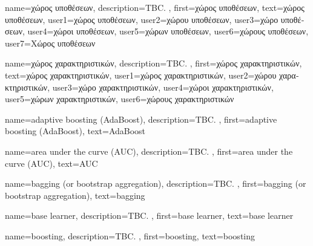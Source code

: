 {name={\foreignlanguage{greek}{χώρος υποθέσεων}}, 
	description={TBC. },
	first={\foreignlanguage{greek}{χώρος υποθέσεων}},
	text={\foreignlanguage{greek}{χώρος υποθέσεων}}, 
	user1={\foreignlanguage{greek}{χώρος υποθέσεων}}, %
	user2={\foreignlanguage{greek}{χώρου υποθέσεων}}, %
	user3={\foreignlanguage{greek}{χώρο υποθέσεων}}, %
	user4={\foreignlanguage{greek}{χώροι υποθέσεων}}, %
	user5={\foreignlanguage{greek}{χώρων υποθέσεων}}, %
	user6={\foreignlanguage{greek}{χώρους υποθέσεων}}, %
	user7={\foreignlanguage{greek}{Χώρος υποθέσεων}} %
}

{name={\foreignlanguage{greek}{χώρος χαρακτηριστικών}},
	description={TBC. },
	first={\foreignlanguage{greek}{χώρος χαρακτηριστικών}},
	text={\foreignlanguage{greek}{χώρος χαρακτηριστικών}},
	user1={\foreignlanguage{greek}{χώρος χαρακτηριστικών}}, %
  	user2={\foreignlanguage{greek}{χώρου χαρακτηριστικών}}, %
	user3={\foreignlanguage{greek}{χώρο χαρακτηριστικών}}, %
	user4={\foreignlanguage{greek}{χώροι χαρακτηριστικών}}, %
  	user5={\foreignlanguage{greek}{χώρων χαρακτηριστικών}}, %
	user6={\foreignlanguage{greek}{χώρους χαρακτηριστικών}} %
}%

\newcommand{\gaussiancenter}{3}

{name={adaptive boosting (AdaBoost)},
	description={TBC. }, 
	first={adaptive boosting (AdaBoost)}, 
	text={AdaBoost}
}

{name={area under the curve (AUC)}, 
	description={TBC. } , 
 	first={area under the curve (AUC)}, 
 	text={AUC} 
}

{name={bagging (or bootstrap aggregation)},
	description={TBC. },
	first={bagging (or bootstrap aggregation)},
	text={bagging}  
}

{name={base learner}, 
	description={TBC. },
	first={base learner},
	text={base learner}
}

{name={boosting}, 
	description={TBC. }, 
	first={boosting}, 
	text={boosting}
}


